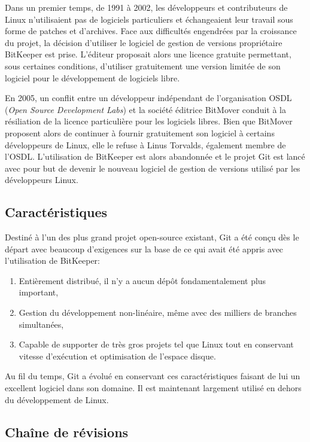 \documentclass[11pt,a4paper]{article}
\begin{document}
Dans un premier temps, de 1991 à 2002, les développeurs et contributeurs de Linux n'utilisaient pas de logiciels particuliers et échangeaient leur travail sous forme de patches et d'archives.
Face aux difficultés engendrées par la croissance du projet, la décision d'utiliser le logiciel de gestion de versions propriétaire BitKeeper est prise.
L'éditeur proposait alors une licence gratuite permettant, sous certaines conditions, d'utiliser gratuitement une version limitée de son logiciel pour le développement de logiciels libre.

En 2005, un conflit entre un développeur indépendant de l'organisation OSDL (\textit{Open Source Development Labs}) et la société éditrice BitMover conduit à la résiliation de la licence particulière pour les logiciels libres.
Bien que BitMover proposent alors de continuer à fournir gratuitement son logiciel à certains développeurs de Linux, elle le refuse à Linus Torvalds, également membre de l'OSDL.
L'utilisation de BitKeeper est alors abandonnée et le projet Git est lancé avec pour but de devenir le nouveau logiciel de gestion de versions utilisé par les développeurs Linux.

\subsection{Caractéristiques}

Destiné à l'un des plus grand projet open-source existant, Git a été conçu dès le départ avec beaucoup d'exigences sur la base de ce qui avait été appris avec l'utilisation de BitKeeper:

\begin{enumerate}
	\item {Entièrement distribué}, 
	il n'y a aucun dépôt fondamentalement plus important,
	
	\item {Gestion du développement non-linéaire},
	même avec des milliers de branches simultanées,
	
	\item {Capable de supporter de très gros projets}
	tel que Linux tout en conservant vitesse d'exécution et optimisation de l'espace disque.
\end{enumerate}

Au fil du temps, Git a évolué en conservant ces caractéristiques faisant de lui un excellent logiciel dans son domaine.
Il est maintenant largement utilisé en dehors du développement de Linux.

\subsection{Chaîne de révisions}
\end{document}
